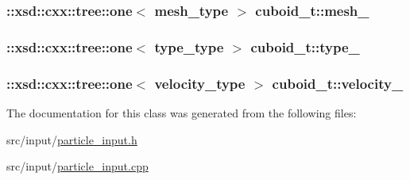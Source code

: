 \subsubsection[{\texorpdfstring{mesh\+\_\+}{mesh_}}]{\setlength{\rightskip}{0pt plus 5cm}\+::xsd\+::cxx\+::tree\+::one$<$ {\bf mesh\+\_\+type} $>$ cuboid\+\_\+t\+::mesh\+\_\+\hspace{0.3cm}{\ttfamily [protected]}}\hypertarget{classcuboid__t_aaac49c075536283060216167d0e71e80}{}\label{classcuboid__t_aaac49c075536283060216167d0e71e80}
\subsubsection[{\texorpdfstring{type\+\_\+}{type_}}]{\setlength{\rightskip}{0pt plus 5cm}\+::xsd\+::cxx\+::tree\+::one$<$ {\bf type\+\_\+type} $>$ cuboid\+\_\+t\+::type\+\_\+\hspace{0.3cm}{\ttfamily [protected]}}\hypertarget{classcuboid__t_a950799bbd14b31cd020481cba9092eb8}{}\label{classcuboid__t_a950799bbd14b31cd020481cba9092eb8}
\subsubsection[{\texorpdfstring{velocity\+\_\+}{velocity_}}]{\setlength{\rightskip}{0pt plus 5cm}\+::xsd\+::cxx\+::tree\+::one$<$ {\bf velocity\+\_\+type} $>$ cuboid\+\_\+t\+::velocity\+\_\+\hspace{0.3cm}{\ttfamily [protected]}}\hypertarget{classcuboid__t_a38590de341c9a52a3cced988ea26d891}{}\label{classcuboid__t_a38590de341c9a52a3cced988ea26d891}


The documentation for this class was generated from the following files\+:\begin{DoxyCompactItemize}
\item 
src/input/\hyperlink{particle__input_8h}{particle\+\_\+input.\+h}\item 
src/input/\hyperlink{particle__input_8cpp}{particle\+\_\+input.\+cpp}\end{DoxyCompactItemize}
